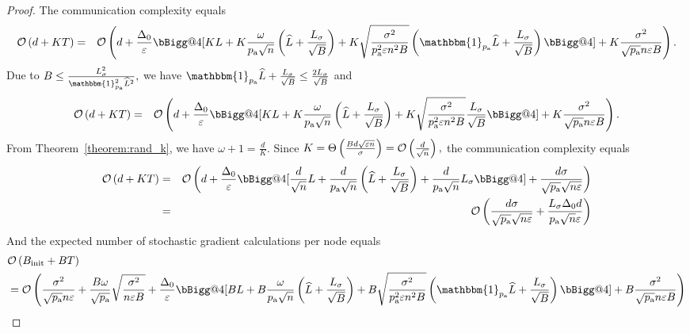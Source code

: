 \documentclass{article}
\makeatletter
\newcommand*{\probavailable}{\ensuremath{p_{\textnormal{a}}}}
\newcommand{\vast}{\bBigg@{4}}
\makeatother
\begin{document}
\begin{proof}
  The communication complexity equals
  \begin{eqnarray*}
      \cO\left(d + K T\right) &=& \cO\left(d + \frac{\Delta_0}{\varepsilon}\vast[K L + K\frac{\omega}{\probavailable \sqrt{n}} \left(\widehat{L} + \frac{L_{\sigma}}{\sqrt{B}}\right) + K \sqrt{\frac{\sigma^2}{\probavailable^2 \varepsilon n^2 B}}\left(\mathbbm{1}_{\probavailable}\widehat{L} + \frac{L_{\sigma}}{\sqrt{B}}\right)\vast] + K\frac{\sigma^2}{\sqrt{\probavailable} n \varepsilon B}\right).
  \end{eqnarray*}
  Due to $B \leq \frac{L_{\sigma}^2}{\mathbbm{1}_{\probavailable}^2\widehat{L}^2}, $ we have $\mathbbm{1}_{\probavailable}\widehat{L} + \frac{L_{\sigma}}{\sqrt{B}} \leq \frac{2L_{\sigma}}{\sqrt{B}}$ and
  \begin{eqnarray*}
    \cO\left(d + K T\right) &=& \cO\left(d + \frac{\Delta_0}{\varepsilon}\vast[K L + K\frac{\omega}{\probavailable \sqrt{n}} \left(\widehat{L} + \frac{L_{\sigma}}{\sqrt{B}}\right) + K \sqrt{\frac{\sigma^2}{\probavailable^2 \varepsilon n^2 B}}\frac{L_{\sigma}}{\sqrt{B}}\vast] + K\frac{\sigma^2}{\sqrt{\probavailable} n \varepsilon B}\right).
\end{eqnarray*}
  From Theorem~\ref{theorem:rand_k}, we have $\omega + 1 = \frac{d}{K}.$ Since $K = \Theta\left(\frac{B d \sqrt{\varepsilon n}}{\sigma}\right) = \mathcal{O}\left(\frac{d}{\sqrt{n}}\right),$ the communication complexity equals
  \begin{eqnarray*}
      \cO\left(d + K T\right) &=& \cO\left(d + \frac{\Delta_0}{\varepsilon}\vast[\frac{d}{\sqrt{n}}L + \frac{d}{\probavailable \sqrt{n}} \left(\widehat{L} + \frac{L_{\sigma}}{\sqrt{B}}\right) + \frac{d}{\probavailable \sqrt{n}} L_{\sigma}\vast] + \frac{d \sigma}{\sqrt{\probavailable} \sqrt{n \varepsilon}}\right) \\
      &=& \cO\left(\frac{d \sigma}{\sqrt{\probavailable} \sqrt{n \varepsilon}} + \frac{L_{\sigma} \Delta_0 d}{\probavailable \sqrt{n} \varepsilon}\right) \\
  \end{eqnarray*}
  And the expected number of stochastic gradient calculations per node equals
  \begin{align*}
      &\cO\left(B_{\textnormal{init}} + B T\right) \\
      &= \cO\left(\frac{\sigma^2}{\sqrt{\probavailable} n \varepsilon} +  \frac{B \omega}{\sqrt{\probavailable}} \sqrt{\frac{\sigma^2}{n \varepsilon B}} + \frac{\Delta_0}{\varepsilon}\vast[B L + B\frac{\omega}{\probavailable \sqrt{n}} \left(\widehat{L} + \frac{L_{\sigma}}{\sqrt{B}}\right) + B \sqrt{\frac{\sigma^2}{\probavailable^2 \varepsilon n^2 B}}\left(\mathbbm{1}_{\probavailable}\widehat{L} + \frac{L_{\sigma}}{\sqrt{B}}\right)\vast] + B\frac{\sigma^2}{\sqrt{\probavailable} n \varepsilon B}\right) \\

\end{align*}
\end{proof}
\end{document}
